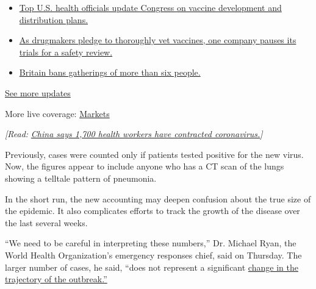 \begin{itemize}
\tightlist
\item
  \href{https://www.nytimes3xbfgragh.onion/2020/09/09/world/covid-19-coronavirus.html?action=click\&pgtype=Article\&state=default\&region=MAIN_CONTENT_1\&context=storylines_live_updates\#link-279e24e2}{Top
  U.S. health officials update Congress on vaccine development and
  distribution plans.}
\item
  \href{https://www.nytimes3xbfgragh.onion/2020/09/09/world/covid-19-coronavirus.html?action=click\&pgtype=Article\&state=default\&region=MAIN_CONTENT_1\&context=storylines_live_updates\#link-5b0bf0d1}{As
  drugmakers pledge to thoroughly vet vaccines, one company pauses its
  trials for a safety review.}
\item
  \href{https://www.nytimes3xbfgragh.onion/2020/09/09/world/covid-19-coronavirus.html?action=click\&pgtype=Article\&state=default\&region=MAIN_CONTENT_1\&context=storylines_live_updates\#link-58edc4cb}{Britain
  bans gatherings of more than six people.}
\end{itemize}

\href{https://www.nytimes3xbfgragh.onion/2020/09/09/world/covid-19-coronavirus.html?action=click\&pgtype=Article\&state=default\&region=MAIN_CONTENT_1\&context=storylines_live_updates}{See
more updates}

More live coverage:
\href{https://www.nytimes3xbfgragh.onion/live/2020/09/09/business/stock-market-today-coronavirus?action=click\&pgtype=Article\&state=default\&region=MAIN_CONTENT_1\&context=storylines_live_updates}{Markets}

\emph{{[}Read:}
\href{https://www.nytimes3xbfgragh.onion/2020/02/14/world/asia/china-coronavirus.html}{\emph{China
says 1,700 health workers have contracted coronavirus.}}\emph{{]}}

Previously, cases were counted only if patients tested positive for the
new virus. Now, the figures appear to include anyone who has a CT scan
of the lungs showing a telltale pattern of pneumonia.

In the short run, the new accounting may deepen confusion about the true
size of the epidemic. It also complicates efforts to track the growth of
the disease over the last several weeks.

``We need to be careful in interpreting these numbers,'' Dr. Michael
Ryan, the World Health Organization's emergency responses chief, said on
Thursday. The larger number of cases, he said, ``does not represent a
significant
\href{https://www.who.int/docs/default-source/coronaviruse/situation-reports/20200213-sitrep-24-covid-19.pdf?sfvrsn=9a7406a4_2}{change
in the trajectory of the outbreak.''}


